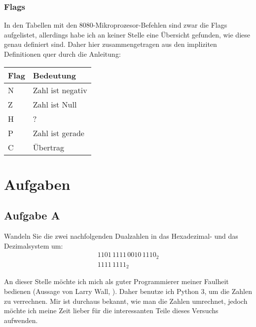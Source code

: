 \subsubsection{Flags}

In den Tabellen mit den 8080-Mikroprozesor-Befehlen sind zwar die Flags
aufgelistet, allerdings habe ich an keiner Stelle eine Übersicht gefunden, wie
diese genau definiert sind. Daher hier zusammengetragen aus den impliziten
Definitionen quer durch die Anleitung:

\begin{tabular}{ll}
	Flag & Bedeutung \\
	\hline
	N & Zahl ist negativ \\
	Z & Zahl ist Null \\
	H & ? \\
	P & Zahl ist gerade \\
	C & Übertrag \\
\end{tabular}


\FloatBarrier
\section{Aufgaben}

\subsection{Aufgabe A}

\begin{problem}
	Wandeln Sie die zwei nachfolgenden Dualzahlen in das Hexadezimal- und das
	Dezimalsystem um:
	\begin{gather*}
		1101\,1111\,0010\,1110_2 \\
		1111\,1111_2
	\end{gather*}
\end{problem}

An dieser Stelle möchte ich mich als guter Programmierer meiner Faulheit
bedienen (Aussage von Larry Wall, \cite{threevirtues.com}). Daher benutze ich
Python 3, um die Zahlen zu verrechnen. Mir ist durchaus bekannt, wie man die
Zahlen umrechnet, jedoch möchte ich meine Zeit lieber für die interessanten
Teile dieses Versuchs aufwenden.

